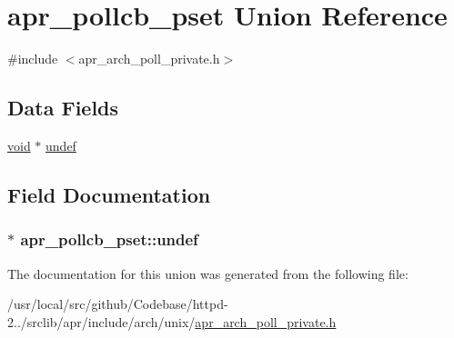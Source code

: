 \hypertarget{unionapr__pollcb__pset}{}\section{apr\+\_\+pollcb\+\_\+pset Union Reference}
\label{unionapr__pollcb__pset}


{\ttfamily \#include $<$apr\+\_\+arch\+\_\+poll\+\_\+private.\+h$>$}

\subsection*{Data Fields}
\begin{DoxyCompactItemize}
\item 
\hyperlink{group__MOD__ISAPI_gacd6cdbf73df3d9eed42fa493d9b621a6}{void} $\ast$ \hyperlink{unionapr__pollcb__pset_ab06f3ab237e5b81592ad4eda05220f29}{undef}
\end{DoxyCompactItemize}


\subsection{Field Documentation}
\subsubsection[{\texorpdfstring{undef}{undef}}]{$\ast$ apr\+\_\+pollcb\+\_\+pset\+::undef}\hypertarget{unionapr__pollcb__pset_ab06f3ab237e5b81592ad4eda05220f29}{}\label{unionapr__pollcb__pset_ab06f3ab237e5b81592ad4eda05220f29}


The documentation for this union was generated from the following file\+:\begin{DoxyCompactItemize}
\item 
/usr/local/src/github/\+Codebase/httpd-\/2../srclib/apr/include/arch/unix/\hyperlink{apr__arch__poll__private_8h}{apr\+\_\+arch\+\_\+poll\+\_\+private.\+h}\end{DoxyCompactItemize}
